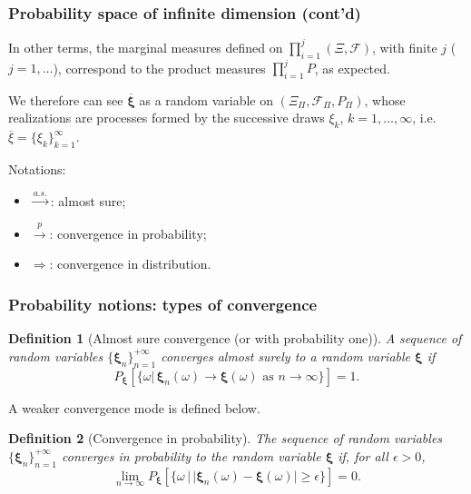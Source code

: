 \documentclass{beamer}
\newtheorem{defi}{Definition}
\def\bxi{\boldsymbol\xi}
\begin{document}
\begin{frame}
\frametitle{Probability space of infinite dimension (cont'd)}

In other terms, the marginal measures defined on $\prod_{i = 1}^j (\Xi, \mathcal{F})$, with finite $j$ ($j = 1,\ldots$), correspond to the product measures $\prod_{i = 1}^j P$, as expected.

\mbox{}

We therefore can see $\overline{\bxi}$ as a random variable on $\left( \Xi_{\Pi}, \mathcal{F}_{\Pi}, P_{\Pi} \right)$, whose realizations are processes formed by the successive draws $\xi_k$, $k = 1,\ldots,\infty$, i.e. 
$\overline{\xi} = \lbrace \xi_k \rbrace_{k = 1}^{\infty}$.

\mbox{}

{\blue Notations:}
\begin{itemize}
\item $\overset{a.s.}{\longrightarrow}$: almost sure;
\item $\overset{p}{\rightarrow}$: convergence in probability;
\item $\Rightarrow$: convergence in distribution.
\end{itemize}

\end{frame}

\begin{frame}
\frametitle{Probability notions: types of convergence}

\begin{defi}[Almost sure convergence (or with probability one)]
A sequence of random variables $\lbrace \bxi_n \rbrace_{n = 1}^{+\infty}$ converges almost surely to a random variable $\bxi$ if
\[
P_{\bxi} [ \lbrace \omega |\, \bxi_n(\omega) \rightarrow \bxi(\omega)
\text{ as } n \rightarrow \infty \rbrace ] = 1.
\]
\end{defi}

\mbox{}

A weaker convergence mode is defined below.

\begin{defi}[Convergence in probability]
The sequence of random variables $\lbrace \bxi_n \rbrace_{n =
  1}^{+\infty}$ converges in probability to the random variable $\bxi$ if, for all $\epsilon > 0$,
\[
\lim_{n \rightarrow \infty} P_{\bxi} [ \lbrace \omega \,|\, |
\bxi_n(\omega) - \bxi(\omega) | \geq \epsilon \rbrace ] = 0.
\]
\end{defi}

\end{frame}
\end{document}
